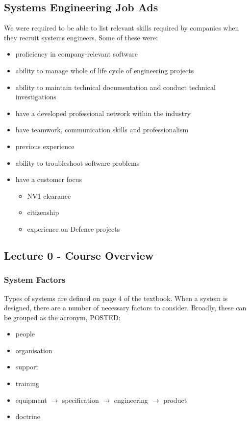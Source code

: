 \documentclass[journal]{IEEEtran}
\begin{document}
\subsection{\textbf{Systems Engineering Job Ads}}
We were required to be able to list relevant skills required by companies when they recruit systems engineers. Some of these were:
\begin{itemize}
	\item proficiency in company-relevant software
	\item ability to manage whole of life cycle of engineering projects
	\item ability to maintain technical documentation and conduct technical investigations
	\item have a developed professional network within the industry
	\item have teamwork, communication skills and professionalism
	\item previous experience
	\item ability to troubleshoot software problems
	\item have a customer focus
	\begin{itemize}
		\item NV1 clearance
		\item citizenship
		\item experience on Defence projects
	\end{itemize}
\end{itemize}
\subsection{\textbf{Lecture 0 - Course Overview}}
\subsubsection{System Factors}
Types of systems are defined on page 4 of the textbook. When a system is designed, there are a number of necessary factors to consider. Broadly, these can be grouped as the acronym, POSTED:
\begin{itemize}
	\item people
	\item organisation
	\item support
	\item training
	\item equipment $\rightarrow$ specification $\rightarrow$ engineering $\rightarrow$ product
	\item doctrine
\end{itemize}
\end{document}

